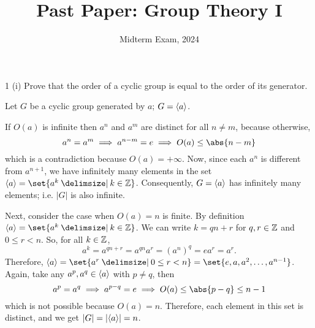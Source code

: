 \documentclass[11pt]{penrose}
\title{Past Paper: Group Theory I}
\subtitle{Midterm Exam, 2024}
\begin{document}
\maketitle
\warningtext

\begin{problem}{1 (i)}
    Prove that the order of a cyclic group is equal to the order of its generator.

    \solution Let $G$ be a cyclic group generated by $a$; $G = \langle a\rangle$.

    If $O(a)$ is infinite then $a^n$ and $a^m$ are distinct for all $n \neq m$, because otherwise,
    \begin{equation*}
        a^n = a^m \implies a^{n - m} = e \implies O(a) \leq \abs{n-m}
    \end{equation*}
    which is a contradiction because $O(a) = +\infty$. Now, since each $a^n$ is different from $a^{n+1}$, we have infinitely many elements in the set $\cyclic{a} = \set{a^k \st k \in \Z}$. Consequently, $G = \langle a\rangle$ has infinitely many elements; i.e. $|G|$ is also infinite.

    Next, consider the case when $O(a) = n$ is finite. By definition $\cyclic{a} = \set{a^k \st k \in \Z}$. We can write $k = qn + r$ for $q, r \in \mathbb{Z}$ and $0 \leq r < n$. So, for all $k \in \mathbb{Z}$,
    \begin{equation*}
        a^k = a^{qn+r} = a^{qn} a^r = (a^{n})^{q} = e a^r = a^r.
    \end{equation*}
    Therefore, $\cyclic{a} = \set{a^r \st 0 \leq r < n} = \set{e, a, a^2, \dots, a^{n-1}}$. Again, take any $a^p, a^q \in \langle a\rangle$ with $p \neq q$, then
    \begin{equation*}
        a^p = a^q \implies a^{p - q} = e \implies O(a) \leq \abs{p-q} \leq n-1
    \end{equation*}
    which is not possible because $O(a) = n$. Therefore, each element in this set is distinct, and we get $|G| = |\langle a\rangle| = n$.
\end{problem}
\end{document}

